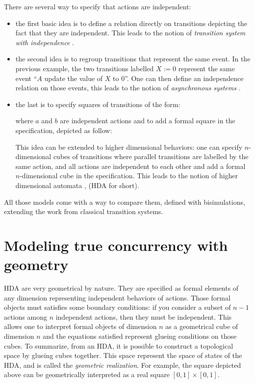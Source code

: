 There are several way to specify that actions are independent:
\begin{itemize}
	\item the first basic idea is to define a relation directly on transitions depicting the fact that  they are independent. This leads to the notion of \emph{transition system with independence} \cite{nielsen94}.
	\item the second idea is to regroup transitions that represent the same event. In the previous example, the two transitions labelled $X := 0$ represent the same event ``$A$ update the value of $X$ to $0$''. One can then define an independence relation on those events, this leads to the notion of \emph{asynchronous systems} \cite{shields85,bednarczyk87}.
	\item the last is to specify squares of transitions of the form:
	\begin{figure}[H]
		\begin{center}
    			
  		\end{center}
	\end{figure}
	where $a$ and $b$ are independent actions and to add a formal square in the specification, depicted as follow:
	\begin{figure}[H]
		\begin{center}
    			
  		\end{center}
	\end{figure}
	
	 This idea can be extended to higher dimensional behaviors: one can specify $n$-dimensional cubes of transitions where parallel transitions are labelled by the same action, and all actions are independent to each other and add a formal $n$-dimensional cube in the specification. This leads to the notion of higher dimensional automata \cite{pratt91}, (HDA for short).
\end{itemize}

All those models come with a way to compare them, defined with bisimulations, extending the work from classical transition systems.


\section*{Modeling true concurrency with geometry}

HDA are very geometrical by nature. They are specified as formal elements of any dimension representing independent behaviors of actions. Those formal objects must satisfies some boundary conditions: if you consider a subset of $n-1$ actions among $n$ independent actions, then they must be independent. This allows one to interpret formal objects of dimension $n$ as a geometrical cube of dimension $n$ and the equations satisfied represent glueing conditions on those cubes. To summarize, from an HDA, it is possible to construct a topological space by glueing cubes together. This space represent the space of states of the HDA, and is called the \emph{geometric realization}. For example, the square depicted above can be geometrically interpreted as a real square $[0,1]\times[0,1]$.


